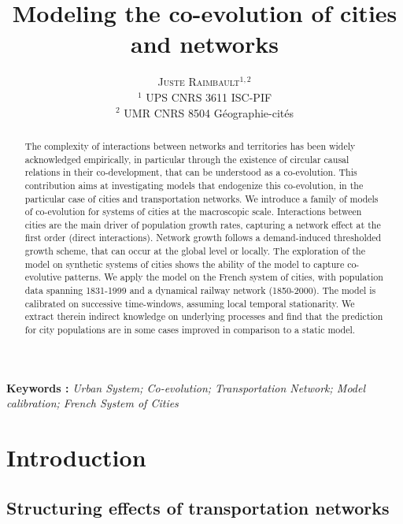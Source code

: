 \documentclass[11pt]{article}
\newcommand{\noun}[1]{\textsc{#1}}
\begin{document}
\title{Modeling the co-evolution of cities and networks}
\author{\noun{Juste Raimbault}$^{1,2}$\\
$^1$ UPS CNRS 3611 ISC-PIF\\
$^2$ UMR CNRS 8504 G{\'e}ographie-cit{\'e}s
}
\date{}


\maketitle

\justify


\begin{abstract}
The complexity of interactions between networks and territories has been widely acknowledged empirically, in particular through the existence of circular causal relations in their co-development, that can be understood as a co-evolution. This contribution aims at investigating models that endogenize this co-evolution, in the particular case of cities and transportation networks. We introduce a family of models of co-evolution for systems of cities at the macroscopic scale. Interactions between cities are the main driver of population growth rates, capturing a network effect at the first order (direct interactions). Network growth follows a demand-induced thresholded growth scheme, that can occur at the global level or locally. The exploration of the model on synthetic systems of cities shows the ability of the model to capture co-evolutive patterns. We apply the model on the French system of cities, with population data spanning 1831-1999 and a dynamical railway network (1850-2000). The model is calibrated on successive time-windows, assuming local temporal stationarity. We extract therein indirect knowledge on underlying processes and find that the prediction for city populations are in some cases improved in comparison to a static model.
\end{abstract}

\textbf{Keywords : }\textit{Urban System; Co-evolution; Transportation Network; Model calibration; French System of Cities}



\section{Introduction}

\subsection{Structuring effects of transportation networks}
\end{document}
